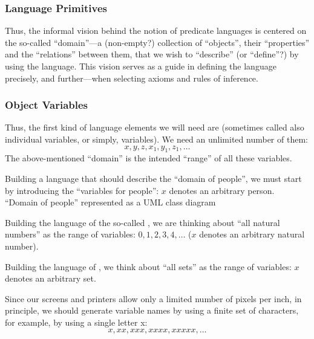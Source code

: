 \subsubsection*{Language Primitives}

Thus, the informal vision behind the notion of predicate languages is centered on the so-called ``domain''---a (non-empty?) collection of ``objects'', their ``properties'' and the ``relations'' between them, that we wish to ``describe'' (or ``define''?) by using the language.
This vision serves as a guide in defining the language precisely, and further---when selecting axioms and rules of inference.

\subsubsection*{Object Variables}

Thus, the first kind of language elements we will need are  (sometimes called also individual variables, or simply, variables).
We need an unlimited number of them:
\[
x, y, z, x_1, y_1, z_1, \ldots
\]
The above-mentioned ``domain'' is the intended ``range'' of all these variables.

\begin{ex}[]
Building a language that should describe the ``domain of people'', we must start by introducing the ``variables for people'': \(x\) denotes an arbitrary person.
``Domain of people'' represented as a UML class diagram
\end{ex}

\begin{ex}[]
Building the language of the so-called , we are thinking about ``all natural numbers'' as the range of variables: \(0, 1, 2, 3, 4, \ldots\) (\(x\) denotes an arbitrary natural number).
\end{ex}

\begin{ex}[]
Building the language of , we think about ``all sets'' as the range of variables: \(x\) denotes an arbitrary set.
\end{ex}

\begin{note}
Since our screens and printers allow only a limited number of pixels per inch, in principle, we
should generate variable names by using a finite set of characters, for example, by using a single letter x:
\[
x, xx, xxx, xxxx, xxxxx, \ldots
\]
\end{note}

